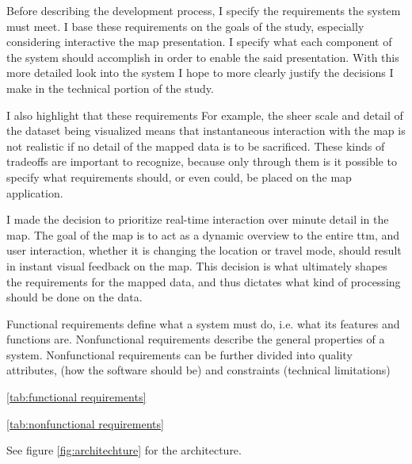 Before describing the development process,
I specify the requirements the system must meet.
I base these requirements on the goals of the study,
especially considering interactive the map presentation.
I specify what each component of the system should accomplish
in order to enable the said presentation.
With this more detailed look into the system I hope to
more clearly justify the decisions
I make in the technical portion of the study.

I also highlight that these requirements
For example, the sheer scale and detail of the dataset being visualized
means that instantaneous interaction with the map is not realistic
if no detail of the mapped data is to be sacrificed.
These kinds of tradeoffs are important to recognize,
because only through them is it possible to specify what
requirements should, or even could, be placed on the map application.

I made the decision to prioritize real-time interaction over minute detail in the map.
The goal of the map is to act as a dynamic overview to the entire \acrshort{ttm},
and user interaction, whether it is changing the location or travel mode,
should result in instant visual feedback on the map.
This decision is what ultimately shapes the requirements for the mapped data,
and thus dictates what kind of processing should be done on the data.

Functional requirements define what a system must do, i.e.
what its features and functions are.
Nonfunctional requirements describe the general properties of a system.
Nonfunctional requirements can be further divided into quality attributes,
(how the software should be) and constraints (technical limitations)

\ref{tab:functional requirements}



\ref{tab:nonfunctional requirements}



See figure \ref{fig:architechture} for the architecture.

